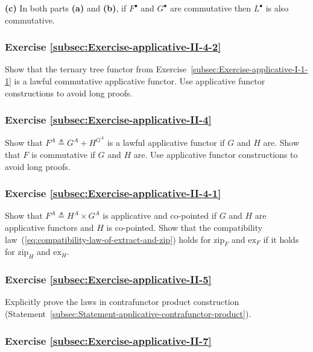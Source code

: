 \textbf{(c)} In both parts \textbf{(a)} and \textbf{(b)}, if $F^{\bullet}$
and $G^{\bullet}$ are commutative then $L^{\bullet}$ is also commutative.

\subsubsection{Exercise \label{subsec:Exercise-applicative-II-4-2}\ref{subsec:Exercise-applicative-II-4-2}}

Show that the ternary tree functor from Exercise~\ref{subsec:Exercise-applicative-I-1-1}
is a lawful commutative applicative functor. Use applicative functor
constructions to avoid long proofs.

\subsubsection{Exercise \label{subsec:Exercise-applicative-II-4}\ref{subsec:Exercise-applicative-II-4}}

Show that $F^{A}\triangleq G^{A}+H^{G^{A}}$ is a lawful applicative
functor if $G$ and $H$ are. Show that $F$ is commutative if $G$
and $H$ are. Use applicative functor constructions to avoid long
proofs.

\subsubsection{Exercise \label{subsec:Exercise-applicative-II-4-1}\ref{subsec:Exercise-applicative-II-4-1}}

Show that $F^{A}\triangleq H^{A}\times G^{A}$ is applicative and
co-pointed if $G$ and $H$ are applicative functors and $H$ is co-pointed.
Show that the compatibility law~(\ref{eq:compatibility-law-of-extract-and-zip})
holds for $\text{zip}_{F}$ and $\text{ex}_{F}$ if it holds for $\text{zip}_{H}$
and $\text{ex}_{H}$.

\subsubsection{Exercise \label{subsec:Exercise-applicative-II-5}\ref{subsec:Exercise-applicative-II-5}}

Explicitly prove the laws in contrafunctor product construction (Statement~\ref{subsec:Statement-applicative-contrafunctor-product}).

\subsubsection{Exercise \label{subsec:Exercise-applicative-II-7}\ref{subsec:Exercise-applicative-II-7}}

